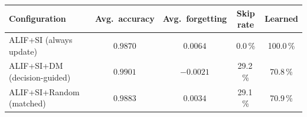 \begin{tabular}{@{}lcccc@{}}
\toprule
\textbf{Configuration} & \textbf{Avg.\ accuracy} & \textbf{Avg.\ forgetting} & \textbf{Skip rate} & \textbf{Learned} \\
\midrule
ALIF+SI (always update) & $0.9870$ & $0.0064$ & 0.0\,\% & 100.0\,\% \\
ALIF+SI+DM (decision-guided) & $0.9901$ & $-0.0021$ & 29.2\,\% & 70.8\,\% \\
ALIF+SI+Random (matched) & $0.9883$ & $0.0034$ & 29.1\,\% & 70.9\,\% \\
\bottomrule
\end{tabular}
